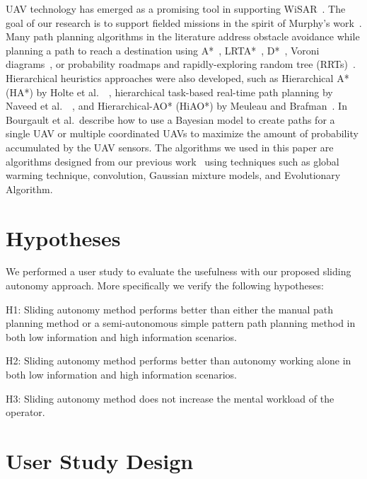 \documentclass[journal]{IEEEtran}
\begin{document}
UAV technology has emerged as a promising tool in supporting WiSAR~\cite{Murphy2008Cooperative,Bourgault2003Coordinated}. The goal of our research is to support fielded missions in the spirit of Murphy's work~\cite{Casper2003Human}. Many path planning algorithms in the literature address obstacle avoidance while planning a path to reach a destination using A*~\cite{Quigley2005Towards}, LRTA*~\cite{Howlett2006Learning}, D*~\cite{Stentz1997Optimal}, Voroni diagrams~\cite{Bortoff2000Path,Beard2005Autonomous}, or probability roadmaps and rapidly-exploring random tree (RRTs)~\cite{Pettersson2006Probabilistic}. Hierarchical heuristics approaches were also developed, such as Hierarchical A* (HA*) by Holte et al.\ ~\cite{Holte1996Hierarchical}, hierarchical task-based real-time path planning by Naveed et al.\ ~\cite{Meuleau2007Hierarchical}, and Hierarchical-AO* (HiAO*) by Meuleau and Brafman~\cite{Naveed2010Hierarchical}. In~\cite{Bourgault2006Optimal, Bourgault2004Coordinated} Bourgault et al.\ describe how to use a Bayesian model to create paths for a single UAV or multiple coordinated UAVs to maximize the amount of probability accumulated by the UAV sensors. The algorithms we used in this paper are algorithms designed from our previous work~\cite{Lin2009UAV,Lin2014Hierarchical} using techniques such as global warming technique, convolution, Gaussian mixture models, and Evolutionary Algorithm.

\section{Hypotheses} 
\label{sec:Hypotheses}

We performed a user study to evaluate the usefulness with our proposed sliding autonomy approach. More specifically we verify the following hypotheses:

H1: Sliding autonomy method performs better than either the manual path planning method or a semi-autonomous simple pattern path planning method in both low information and high information scenarios.

H2: Sliding autonomy method performs better than autonomy working alone in both low information and high information scenarios.

H3: Sliding autonomy method does not increase the mental workload of the operator.

\section{User Study Design} 
\label{sec:Design}
\end{document}
